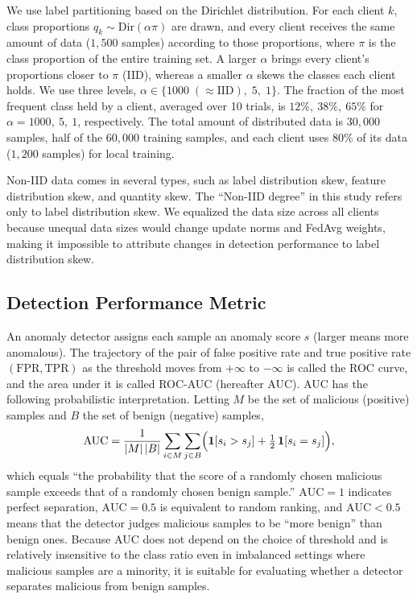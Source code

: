 \documentclass[a4paper,10pt]{article}
\begin{document}
We use label partitioning based on the Dirichlet distribution\cite{hsu2019measuring}. For each client $k$, class proportions $q_k \sim \mathrm{Dir}(\alpha \pi)$ are drawn, and every client receives the same amount of data ($1{,}500$ samples) according to those proportions, where $\pi$ is the class proportion of the entire training set. A larger $\alpha$ brings every client's proportions closer to $\pi$ (IID), whereas a smaller $\alpha$ skews the classes each client holds. We use three levels, $\alpha \in \{1000\;(\approx\text{IID}),\; 5,\; 1\}$. The fraction of the most frequent class held by a client, averaged over 10 trials, is $12\%,\ 38\%,\ 65\%$ for $\alpha=1000,\ 5,\ 1$, respectively. The total amount of distributed data is $30{,}000$ samples, half of the $60{,}000$ training samples, and each client uses 80\% of its data ($1{,}200$ samples) for local training.

Non-IID data comes in several types, such as label distribution skew, feature distribution skew, and quantity skew\cite{li2022federated}. The ``Non-IID degree'' in this study refers only to label distribution skew. We equalized the data size across all clients because unequal data sizes would change update norms and FedAvg weights, making it impossible to attribute changes in detection performance to label distribution skew.

\subsection{Detection Performance Metric}
\label{sec:roc-auc}

An anomaly detector assigns each sample an anomaly score $s$ (larger means more anomalous). The trajectory of the pair of false positive rate and true positive rate $(\mathrm{FPR}, \mathrm{TPR})$ as the threshold moves from $+\infty$ to $-\infty$ is called the ROC curve, and the area under it is called ROC-AUC (hereafter AUC)\cite{fawcett2006roc}. AUC has the following probabilistic interpretation\cite{hanley1982meaning}. Letting $M$ be the set of malicious (positive) samples and $B$ the set of benign (negative) samples,
\begin{equation}
\mathrm{AUC}
= \frac{1}{|M|\,|B|}\sum_{i \in M}\sum_{j \in B}
\Bigl( \mathbf{1}[s_i > s_j] + \tfrac{1}{2}\,\mathbf{1}[s_i = s_j] \Bigr),
\label{eq:auc}
\end{equation}
which equals ``the probability that the score of a randomly chosen malicious sample exceeds that of a randomly chosen benign sample.'' $\mathrm{AUC}=1$ indicates perfect separation, $\mathrm{AUC}=0.5$ is equivalent to random ranking, and $\mathrm{AUC}<0.5$ means that the detector judges malicious samples to be ``more benign'' than benign ones. Because AUC does not depend on the choice of threshold and is relatively insensitive to the class ratio even in imbalanced settings where malicious samples are a minority, it is suitable for evaluating whether a detector separates malicious from benign samples.
\end{document}
